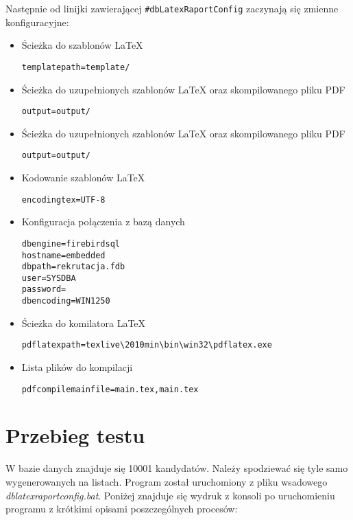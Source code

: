 Następnie od linijki zawierającej \texttt{\#dbLatexRaportConfig} zaczynają się zmienne konfiguracyjne:
  \begin{itemize}
  \item Ścieżka do szablonów LaTeX
   \begin{lstlisting}
templatepath=template/
  \end{lstlisting}
  \item Ścieżka do uzupełnionych szablonów LaTeX oraz skompilowanego pliku PDF
  \begin{lstlisting}
output=output/
 \end{lstlisting}
 \item Ścieżka do uzupełnionych szablonów LaTeX oraz skompilowanego pliku PDF
  \begin{lstlisting}
output=output/
 \end{lstlisting}
  \item Kodowanie szablonów LaTeX
   \begin{lstlisting}
encodingtex=UTF-8
  \end{lstlisting}
   \item Konfiguracja połączenia z bazą danych
    \begin{lstlisting}
dbengine=firebirdsql
hostname=embedded
dbpath=rekrutacja.fdb
user=SYSDBA
password=
dbencoding=WIN1250
   \end{lstlisting}
  \item Ścieżka do komilatora LaTeX
   \begin{lstlisting}
pdflatexpath=texlive\2010min\bin\win32\pdflatex.exe
  \end{lstlisting}
    \item Lista plików do kompilacji
 \begin{lstlisting}
pdfcompilemainfile=main.tex,main.tex
\end{lstlisting}
\end{itemize}
\section{Przebieg testu}

W bazie danych znajduje się 10001 kandydatów. Należy spodziewać się tyle samo wygenerowanych na listach.  Program został uruchomiony z pliku wsadowego \emph{dblatexraportconfig.bat}. Poniżej znajduje się wydruk z konsoli po uruchomieniu programu z krótkimi opisami poszczególnych procesów:

